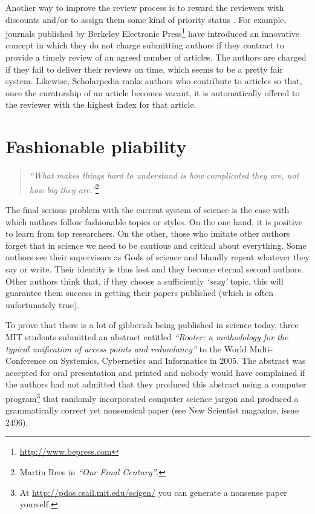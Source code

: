 \documentclass[graybox,envcountchap,sectrefs,UStrade]{svmono}
\begin{document}
Another way to improve the review process is to reward the reviewers with discounts and/or to assign them some kind of priority status \citep{Newmark2003Nature}. For example, journals published by Berkeley Electronic Press\footnote{\url{http://www.bepress.com}} have introduced an innovative concept in which they do not charge submitting authors if they contract to provide a timely review of an agreed number of articles. The authors are charged if they fail to deliver their reviews on time, which seems to be a pretty fair system. Likewise, Scholarpedia ranks authors who contribute to articles so that, once the curatorship of an article becomes vacant, it is automatically offered to the reviewer with the highest index for that article. \par


\section{Fashionable pliability}

\begin{quote}
    \emph{``What makes things hard to understand is how complicated they are, not how big they are.''}\footnote{Martin Rees in \emph{``Our Final Century''}.}
\end{quote}

The final serious problem with the current system of science is the ease with which authors follow fashionable topics or styles. On the one hand, it is positive to learn from top researchers. On the other, those who imitate other authors forget that in science we need to be cautious and critical about everything. Some authors see their supervisors as Gods of science and blandly repeat whatever they say or write. Their identity is thus lost and they become eternal second authors. Other authors think that, if they choose a sufficiently \emph{`sexy'} topic, this will guarantee them success in getting their papers published (which is often unfortunately true). \par

To prove that there is a lot of gibberish being published in science today, three MIT students submitted an abstract entitled \emph{``Rooter: a methodology for the typical unification of access points and redundancy''} to the World Multi-Conference on Systemics, Cybernetics and Informatics in 2005. The abstract was accepted for oral presentation and printed and nobody would have complained if the authors had not admitted that they produced this abstract using a computer program\footnote{At \url{http://pdos.csail.mit.edu/scigen/} you can generate a nonsense paper yourself.} that randomly incorporated computer science jargon and produced a grammatically correct yet nonsensical paper (see New Scientist magazine, issue 2496).\par
\end{document}
